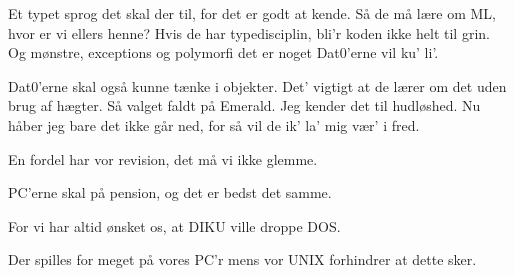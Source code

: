 \documentclass[a4paper,11pt]{article}
\begin{document}
\begin{song}
%
Et typet sprog det skal der til,
for det er godt at kende.
Så de må lære om ML,
hvor er vi ellers henne?
Hvis de har typedisciplin,
bli'r koden ikke helt til grin.
Og mønstre, exceptions og polymorfi
det er noget Dat0'erne vil ku' li'.


%
Dat0'erne skal også kunne
tænke i objekter.
Det' vigtigt at de lærer om det
uden brug af hægter.
Så valget faldt på Emerald.
Jeg kender det til hudløshed.
Nu håber jeg bare det ikke går ned,
for så vil de ik' la' mig vær' i fred.


%
En fordel har vor revision,
det må vi ikke glemme.

%
PC'erne skal på pension,
og det er bedst det samme.

%
For vi har altid ønsket os,
at DIKU ville droppe DOS.

%
Der spilles for meget på vores PC'r
mens vor UNIX forhindrer at dette sker.
\end{song}
\end{document}
